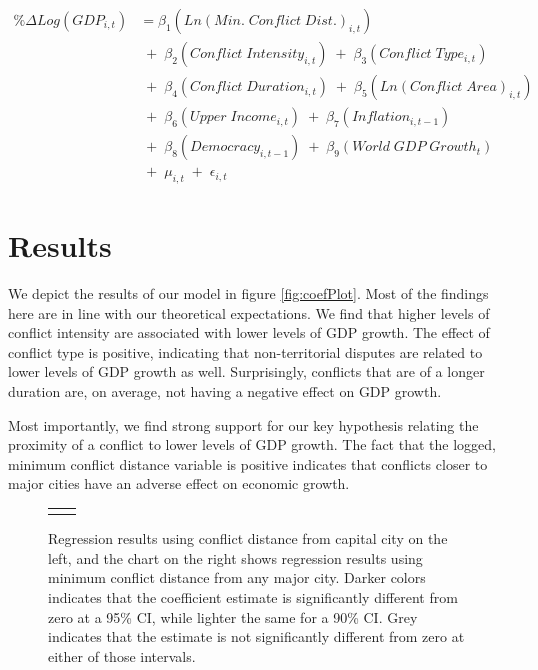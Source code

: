 \begin{align*}
	\% \Delta Log(GDP_{i,t}) &= \beta_{1}(Ln(Min. \; Conflict \; Dist.)_{i,t}) \\
	& \;+\; \beta_{2}(Conflict \; Intensity_{i,t}) \;+\; \beta_{3}(Conflict \; Type_{i,t}) \\
	& \;+\; \beta_{4}(Conflict \; Duration_{i,t}) \;+\; \beta_{5}(Ln(Conflict \; Area)_{i,t}) \\	
	& \;+\; \beta_{6}(Upper \; Income_{i,t}) \;+\; \beta_{7}(Inflation_{i,t-1}) \\
	&  \;+\; \beta_{8}(Democracy_{i,t-1}) \;+\; \beta_{9}(World \; GDP \; Growth_{t}) \\
	& \;+\; \mu_{i,t} \;+\; \epsilon_{i,t}
\end{align*}

\section{Results}
\label{findings} 

We depict the results of our model in figure \ref{fig:coefPlot}. Most of the findings here are in line with our theoretical expectations. We find that higher levels of conflict intensity are associated with lower levels of GDP growth. The effect of conflict type is positive, indicating that non-territorial disputes are related to lower levels of GDP growth as well. Surprisingly, conflicts that are of a longer duration are, on average, not having a negative effect on GDP growth. 

Most importantly, we find strong support for our key hypothesis relating the proximity of a conflict to lower levels of GDP growth. The fact that the logged, minimum conflict distance variable is positive indicates that conflicts closer to major cities have an adverse effect on economic growth. 

\begin{figure}
	\centering
	\begin{tabular}{cc}
		\subfloat[SubFigure 1][Capital City]{
			\resizebox{.45\textwidth}{!}{}
		\label{fig:capCoef}} &
		\subfloat[SubFigure 2][Any City]{
			\resizebox{.45\textwidth}{!}{}
		\label{fig:cityCoef}}
	\end{tabular}
	\caption{Regression results using conflict distance from capital city on the left, and the chart on the right shows regression results using minimum conflict distance from any major city. Darker colors indicates that the coefficient estimate is significantly different from zero at a 95\% CI, while lighter the same for a 90\% CI. Grey indicates that the estimate is not significantly different from zero at either of those intervals.}
	\label{fig:coefplot}
\end{figure}

